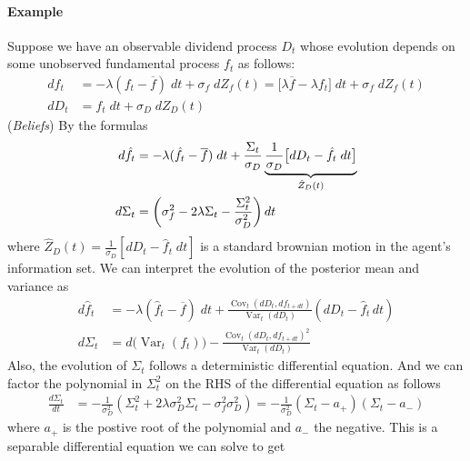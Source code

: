 \documentclass[12pt]{article}
\theoremstyle{plain}
\theoremstyle{definition}
\theoremstyle{remark}
\newcommand{\Cov}{\operatorname{Cov}}
\newcommand{\Var}{\operatorname{Var}}
\begin{document}
\paragraph{Example}
Suppose we have an observable dividend process $D_t$ whose evolution
depends on some unobserved fundamental process $f_t$ as follows:
\begin{align*}
  df_t
  &= -\lambda(f_t-\overline{f})\;dt + \sigma_f\;dZ_f(t)
  = \big[\lambda \overline{f} -\lambda f_t\big]\;dt + \sigma_f\;dZ_f(t)
  \\
  dD_t
  &= f_t\;dt + \sigma_D \;dZ_D(t)
\end{align*}
(\emph{Beliefs})
By the formulas
\begin{align}
  d\hat{f}_t &=
  -\lambda(
  \hat{f}_t-\overline{f}
  )\;dt
  +
  \frac{\Sigma_t}{\sigma_D}
  \underbrace{%
    \frac{1}{\sigma_D}
    \big[
      dD_t - \hat{f}_t\;dt
    \big]
  }_{\hat{Z}_D(t)}
  \label{fhat}
  \\
  d\Sigma_t
  &=
  \left(
  \sigma^2_f
  -2\lambda \Sigma_t
  - \frac{\Sigma_t^2}{\sigma_D^2}
  \right)dt
  \notag
\end{align}
where $\hat{Z}_D(t)=\frac{1}{\sigma_D}[dD_t-\hat{f}_t\;dt]$ is a
standard brownian motion in the agent's information set.
We can interpret the evolution of the posterior mean and variance as
\begin{align*}
  d\hat{f}_t &=
  -\lambda(
  \hat{f}_t-\overline{f}
  )\;dt
  +
  \frac{\Cov_t(dD_t,df_{t+dt})}{\Var_t(dD_t)}(dD_t-\hat{f}_t\,dt)
  \\
  d\Sigma_t
  &=
  d\big(\Var_t(f_t)\big)
  - \frac{\Cov_t(dD_t,df_{t+dt})^2}{\Var_t(dD_t)}
\end{align*}
Also, the evolution of $\Sigma_t$ follows a deterministic differential
equation. And we can factor the polynomial in $\Sigma^2_t$ on the RHS of
the differential equation as follows
\begin{align*}
  \frac{d\Sigma_t}{dt}
  &=
  -\frac{1}{\sigma^2_D}
  \left(
  \Sigma_t^2
  +2\lambda \sigma_D^2\Sigma_t
  -\sigma^2_f\sigma_D^2
  \right)
  =
  -\frac{1}{\sigma^2_D}
  (\Sigma_t-a_+)
  (\Sigma_t-a_-)
\end{align*}
where $a_+$ is the postive root of the polynomial and $a_-$ the
negative.
This is a separable differential equation we can solve to get
\end{document}
